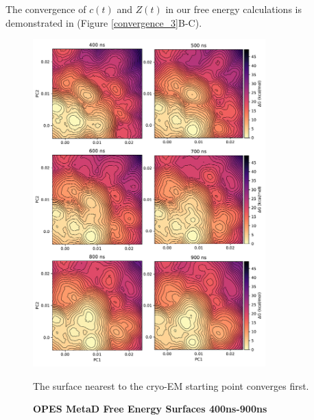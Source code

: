The convergence of $c(t)$ and $Z(t)$ in our free energy calculations is demonstrated in (Figure \ref{convergence_3}B-C). 

\begin{figure}
	\begin{center}
		\includegraphics[width=0.8\textwidth]{figures/opening/convergence_1.pdf}
	\end{center}
	\captionsetup{singlelinecheck = false, justification=raggedright}
	\caption[OPES MetaD Free Energy Surfaces 400ns-900ns] {\textbf{OPES MetaD Free Energy Surfaces 400ns-900ns}}{The surface nearest to the cryo-EM starting point converges first.} 
	\label{convergence_opes_1}
\end{figure}

